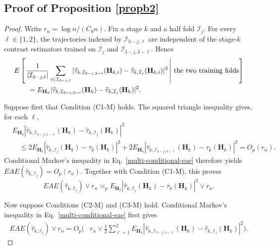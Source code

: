 \documentclass[11pt]{article}
\theoremstyle{referenceplain}
\theoremstyle{referencedefinition}
\theoremstyle{referenceremark}
\begin{document}
\subsection{Proof of Proposition \ref{propb2}}
\begin{proof}
Write $r_n=\log n/({C_0}n)$. Fix a stage $k$ and a half fold $\mathcal I_j$. For every $\ell\in\{1,2\}$, the trajectories indexed by $\mathcal I_{3-j,\ell}$ are independent of the stage-$k$ contrast estimators trained on $\mathcal I_j$ and $\mathcal I_{3-j,3-\ell}$. Hence
\begin{align}
&E\left[\left.
\frac{1}{|\mathcal I_{3-j,\ell}|}\sum_{i\in\mathcal I_{3-j,\ell}}
|\widehat\tau_{k,\mathcal I_{3-j,3-\ell}}(\mathbf H_{k,i})
-\widehat\tau_{k,\mathcal I_j}(\mathbf H_{k,i})|^2
\,\right|\,\text{the two training folds}\right]\notag\\
&\qquad=
E_{\mathbf H_k}|\widehat\tau_{k,\mathcal I_{3-j,3-\ell}}(\mathbf H_k)
-\widehat\tau_{k,\mathcal I_j}(\mathbf H_k)|^2.
\label{multi-conditional-eae}
\end{align}

Suppose first that Condition (C1-M) holds. The squared triangle inequality gives, for each $\ell$,
\begin{align*}
&E_{\mathbf H_k}|\widehat\tau_{k,\mathcal I_{3-j,3-\ell}}(\mathbf H_k)
-\widehat\tau_{k,\mathcal I_j}(\mathbf H_k)|^2\\
&\quad\le2E_{\mathbf H_k}|\widehat\tau_{k,\mathcal I_j}(\mathbf H_k)-\tau_k(\mathbf H_k)|^2
+2E_{\mathbf H_k}|\widehat\tau_{k,\mathcal I_{3-j,3-\ell}}(\mathbf H_k)-\tau_k(\mathbf H_k)|^2
=O_p(r_n).
\end{align*}
Conditional Markov's inequality in Eq.~\eqref{multi-conditional-eae} therefore yields
$EAE(\widehat\tau_{k,\mathcal I_j})=O_p(r_n)$. Together with Condition (C1-M), this proves
\begin{equation}\label{multi-tracking}
EAE(\widehat\tau_{k,\mathcal I_j})\vee r_n
\asymp_p E_{\mathbf H_k}|\widehat\tau_{k,\mathcal I_j}(\mathbf H_k)-\tau_k(\mathbf H_k)|^2\vee r_n.
\end{equation}

Now suppose Conditions (C2-M) and (C3-M) hold. Conditional Markov's inequality in Eq.~\eqref{multi-conditional-eae} first gives
\begin{align*}
EAE(\widehat\tau_{k,\mathcal I_j})\vee r_n
=O_p\Bigg(&r_n\vee\frac12\sum_{\ell=1}^2
E_{\mathbf H_k}|\widehat\tau_{k,\mathcal I_{3-j,3-\ell}}(\mathbf H_k)
-\widehat\tau_{k,\mathcal I_j}(\mathbf H_k)|^2\Bigg).
\end{align*}


\end{proof}
\end{document}
